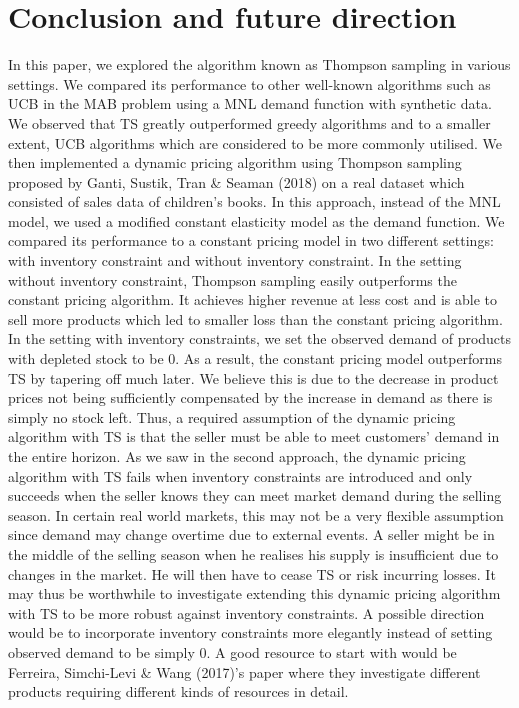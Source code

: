 \documentclass[a4paper]{article}
\begin{document}
\section{Conclusion and future direction}
In this paper, we explored the algorithm known as Thompson sampling in various settings. We compared its performance to other well-known algorithms such as UCB in the MAB problem using a MNL demand function with synthetic data. We observed that TS greatly outperformed greedy algorithms and to a smaller extent, UCB algorithms which are considered to be more commonly utilised. 
\newline
\newline
We then implemented a dynamic pricing algorithm using Thompson sampling proposed by Ganti, Sustik, Tran \& Seaman (2018) on a real dataset which consisted of sales data of children's books. In this approach, instead of the MNL model, we used a modified constant elasticity model as the demand function. We compared its performance to a constant pricing model in two different settings: with inventory constraint and without inventory constraint. In the setting  without inventory constraint, Thompson sampling easily outperforms the constant pricing algorithm. It achieves higher revenue at less cost and is able to sell more products which led to smaller loss than the constant pricing algorithm. In the setting with inventory constraints, we set the observed demand of products with depleted stock to be 0. As a result, the constant pricing model outperforms TS by tapering off much later. We believe this is due to the decrease in product prices not being sufficiently compensated by the increase in demand as there is simply no stock left. Thus, a required assumption of the dynamic pricing algorithm with TS is that the seller must be able to meet customers' demand in the entire horizon.
\newline
\newline
As we saw in the second approach, the dynamic pricing algorithm with TS fails when inventory constraints are introduced and only succeeds when the seller knows they can meet market demand during the selling season. In certain real world markets, this may not be a very flexible assumption since demand may change overtime due to external events. A seller might be in the middle of the selling season when he realises his supply is insufficient due to changes in the market. He will then have to cease TS or risk incurring losses. It may thus be worthwhile to investigate extending this dynamic pricing algorithm with TS to be more robust against inventory constraints. A possible direction would be to incorporate inventory constraints more elegantly instead of setting observed demand to be simply 0. A good resource to start with would be Ferreira, Simchi-Levi \& Wang (2017)'s paper where they investigate different products requiring different kinds of resources in detail.
\newpage
\end{document}
